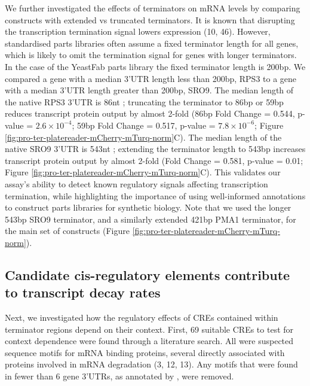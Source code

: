 \documentclass[../main.tex]{subfiles}
\begin{document}
We further investigated the effects of terminators on mRNA levels by comparing constructs with extended vs truncated terminators.
It is known that disrupting the transcription termination signal lowers expression (10, 46).
However, standardised parts libraries often assume a fixed terminator length for all genes, which is likely to omit the termination signal for genes with longer terminators.
In the case of the YeastFab parts library \parencite{Guo2015} the fixed terminator length is 200bp.
We compared a gene with a median 3'UTR length less than 200bp, RPS3 to a gene with a median 3'UTR length greater than 200bp, SRO9.
The median length of the native RPS3 3'UTR is 86nt \parencite{Pelechano2013}; truncating the terminator to 86bp or 59bp reduces transcript protein output by almost 2-fold (86bp Fold Change = 0.544, p-value = \(2.6 \times 10^{-4}\); 59bp Fold Change = 0.517, p-value = \(7.8 \times 10^{-6}\); Figure \ref{fig:pro-ter-platereader-mCherry-mTurq-norm}C).
The median length of the native SRO9 3'UTR is 543nt \parencite{Pelechano2013}; extending the terminator length to 543bp increases transcript protein output by almost 2-fold (Fold Change = 0.581, p-value = 0.01; Figure \ref{fig:pro-ter-platereader-mCherry-mTurq-norm}C).
This validates our assay's ability to detect known regulatory signals affecting transcription termination, while highlighting the importance of using well-informed annotations to construct parts libraries for synthetic biology.
Note that we used the longer 543bp SRO9 terminator, and a similarly extended 421bp PMA1 terminator, for the main set of constructs (Figure \ref{fig:pro-ter-platereader-mCherry-mTurq-norm}).

\subsection{Candidate cis-regulatory elements contribute to transcript decay rates}

Next, we investigated how the regulatory effects of CREs contained within terminator regions depend on their context.
First, 69 suitable CREs to test for context dependence were found through a literature search.
All were suspected sequence motifs for mRNA binding proteins, several directly associated with proteins involved in mRNA degradation (3, 12, 13).
Any motifs that were found in fewer than 6 gene 3'UTRs, as annotated by \parencite{Pelechano2013}, were removed.
\end{document}
